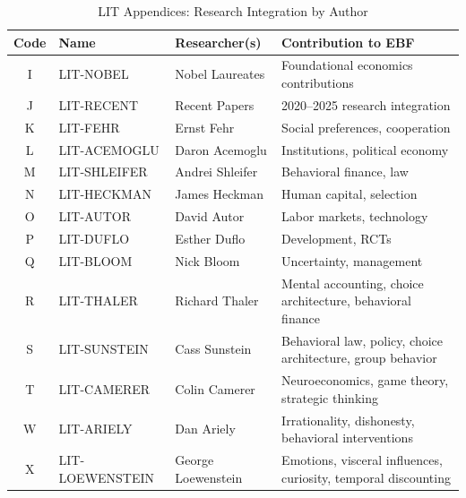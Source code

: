 \begin{table}[htbp]
\centering
\caption{LIT Appendices: Research Integration by Author}
\label{tab:index-lit}
\renewcommand{\arraystretch}{1.3}
\begin{tabular}{@{}cllp{5cm}@{}}
\toprule
\textbf{Code} & \textbf{Name} & \textbf{Researcher(s)} & \textbf{Contribution to EBF} \\
\midrule
I & LIT-NOBEL & Nobel Laureates & Foundational economics contributions \\
J & LIT-RECENT & Recent Papers & 2020--2025 research integration \\
K & LIT-FEHR & Ernst Fehr & Social preferences, cooperation \\
L & LIT-ACEMOGLU & Daron Acemoglu & Institutions, political economy \\
M & LIT-SHLEIFER & Andrei Shleifer & Behavioral finance, law \\
N & LIT-HECKMAN & James Heckman & Human capital, selection \\
O & LIT-AUTOR & David Autor & Labor markets, technology \\
P & LIT-DUFLO & Esther Duflo & Development, RCTs \\
Q & LIT-BLOOM & Nick Bloom & Uncertainty, management \\
R & LIT-THALER & Richard Thaler & Mental accounting, choice architecture, behavioral finance \\
S & LIT-SUNSTEIN & Cass Sunstein & Behavioral law, policy, choice architecture, group behavior \\
T & LIT-CAMERER & Colin Camerer & Neuroeconomics, game theory, strategic thinking \\
W & LIT-ARIELY & Dan Ariely & Irrationality, dishonesty, behavioral interventions \\
X & LIT-LOEWENSTEIN & George Loewenstein & Emotions, visceral influences, curiosity, temporal discounting \\


\end{tabular}
\end{table}
